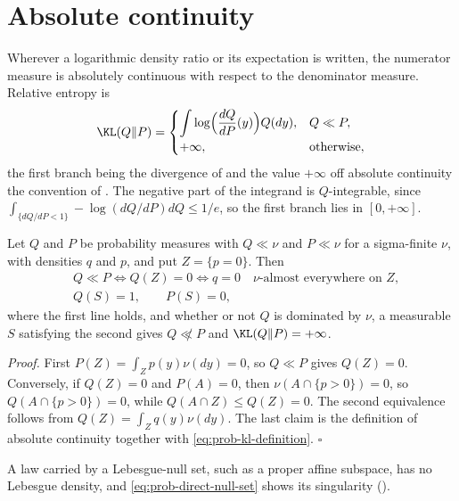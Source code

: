 \section{Absolute continuity}
\label{sec:prob-abscont}

Wherever a logarithmic density ratio or its expectation is written, the numerator measure is absolutely
continuous with respect to the denominator measure. Relative entropy is
\begin{equation}
\KL(Q\Vert P)=
\begin{cases}
\displaystyle\int\log\Bigl(\frac{dQ}{dP}(y)\Bigr)Q(dy), & Q\ll P,\\[1.2ex]
+\infty, & \text{otherwise},
\end{cases}
\label{eq:prob-kl-definition}
\end{equation}
the first branch being the divergence of \citet{Kullback1951} and the value $+\infty$ off absolute
continuity the convention of \citet{Csiszar1967}. The negative part of the integrand is $Q$-integrable,
since $\int_{\{dQ/dP<1\}}-\log(dQ/dP)dQ\leq1/e$, so the first branch lies in $[0,+\infty]$.

Let $Q$ and $P$ be probability measures with $Q\ll\nu$ and $P\ll\nu$ for a sigma-finite $\nu$, with
densities $q$ and $p$, and put $Z=\{p=0\}$. Then
\begin{align}
&Q\ll P
\iff
Q(Z)=0
\iff
q=0\quad\nu\text{-almost everywhere on }Z,
\label{eq:prob-abscont-criterion}\\
&Q(S)=1,
\qquad
P(S)=0,
\label{eq:prob-direct-null-set}
\end{align}
where the first line holds, and whether or not $Q$ is dominated by $\nu$, a measurable $S$ satisfying the
second gives $Q\not\ll P$ and $\KL(Q\Vert P)=+\infty$. 

\noindent\emph{Proof.}
First $P(Z)=\int_Zp(y)\nu(dy)=0$, so $Q\ll P$ gives $Q(Z)=0$. Conversely, if $Q(Z)=0$ and $P(A)=0$, then
$\nu(A\cap\{p>0\})=0$, so $Q(A\cap\{p>0\})=0$, while $Q(A\cap Z)\leq Q(Z)=0$. The second equivalence
follows from $Q(Z)=\int_Zq(y)\nu(dy)$. The last claim is the definition of absolute continuity together with
\eqref{eq:prob-kl-definition}. \hfill$\square$

A law carried by a Lebesgue-null set, such as a proper affine subspace, has no Lebesgue density, and
\eqref{eq:prob-direct-null-set} shows its singularity ().

